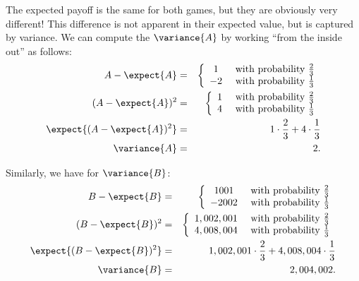 The expected payoff is the same for both games, but they are obviously
very different!  This difference is not apparent in their expected value,
but is captured by variance.  We can compute the $\variance{A}$ by working
``from the inside out'' as follows:
\begin{eqnarray*}
A - \expect{A}
        & = &   \left\{
                \begin{array}{cl}
                        1 & \text{ with probability } \frac{2}{3} \\
                        -2 & \text{ with probability } \frac{1}{3}
                \end{array}
                \right. \\
(A - \expect{A})^2
        & = &   \left\{
                \begin{array}{cl}
                        1 & \text{ with probability } \frac{2}{3} \\
                        4 & \text{ with probability } \frac{1}{3}
                \end{array}
                \right. \\
\expect{(A - \expect{A})^2}
        & = &   1 \cdot \frac{2}{3} + 4 \cdot \frac{1}{3} \\
\variance{A} & = & 2.
\end{eqnarray*}

Similarly, we have for $\variance{B}$:
\begin{eqnarray*}
B - \expect{B}
        & = &   \left\{
                \begin{array}{cl}
                        1001 & \text{ with probability } \frac{2}{3} \\
                        -2002 & \text{ with probability } \frac{1}{3}
                \end{array}
                \right. \\
(B - \expect{B})^2
        & = &   \left\{
                \begin{array}{cl}
                        1,002,001 & \text{ with probability } \frac{2}{3} \\
                        4,008,004 & \text{ with probability } \frac{1}{3}
                \end{array}
                \right. \\
\expect{(B - \expect{B})^2}
        & = &   1,002,001 \cdot \frac{2}{3} + 4,008,004 \cdot \frac{1}{3} \\
\variance{B} & = & 2,004,002.
\end{eqnarray*}

